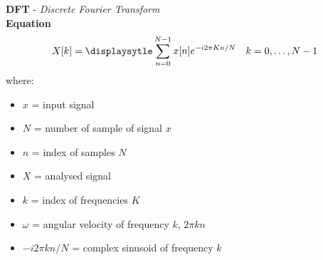 \documentclass[12pt]{article}
\begin{document}
\noindent
\Huge{\textbf{DFT} - \textit{Discrete Fourier Transform}}
\normalsize
\newline
\newline
\\
\newline
\textbf{Equation}
\begin{equation}
X[k] = \displaysytle\sum_{n=0}^{N-1} x[n]e^{-i2\pi Kn/N} \ \ \ k = 0, \dots, N-1
\end{equation}
where:
\begin{itemize}
\item $x$ = input signal 
\item $N$ = number of sample of signal $x$ 
\item $n$ = index of samples $N$
\item $X$ = analysed signal
\item $k$ = index of frequencies $K$
\item $\omega$ = angular velocity of frequency $k$, $ 2\pi kn$
\item $-i2\pi kn/N$ = complex sinusoid of frequency $k$
\end{itemize}
\end{document}
